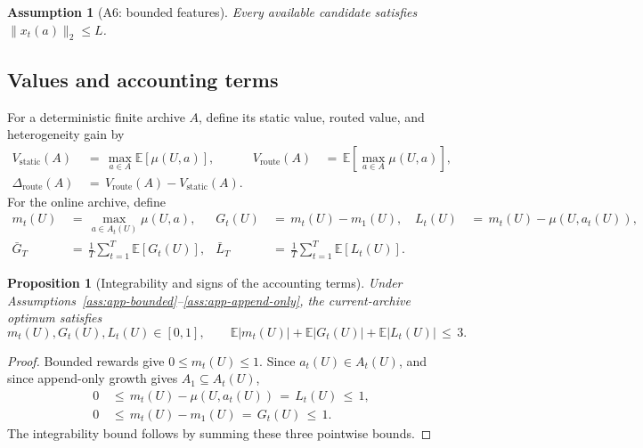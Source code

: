 \documentclass{article} %
\newtheorem{proposition}[theorem]{Proposition}
\newtheorem{assumption}{Assumption}
\begin{document}
\begin{assumption}[A6: bounded features]
\label{ass:app-features}
Every available candidate satisfies \(\|x_t(a)\|_2\leq L\).
\end{assumption}

\subsection{Values and accounting terms}

For a deterministic finite archive \(A\), define its static value, routed
value, and heterogeneity gain by
\begin{equation}
\begin{aligned}
V_{\mathrm{static}}(A)
&\,=\,\max_{a\in A}\mathbb E[\mu(U,a)], &
V_{\mathrm{route}}(A)
&\,=\,\mathbb E\!\left[\max_{a\in A}\mu(U,a)\right], \\
\Delta_{\mathrm{route}}(A)
&\,=\,V_{\mathrm{route}}(A)-V_{\mathrm{static}}(A).
\end{aligned}
\end{equation}
For the online archive, define
\begin{equation}
\begin{aligned}
m_t(U)
&\,=\,\max_{a\in A_t(U)}\mu(U,a), &
G_t(U)
&\,=\,m_t(U)-m_1(U), &
L_t(U)
&\,=\,m_t(U)-\mu(U,a_t(U)), \\
\bar G_T
&\,=\,\frac1T\sum_{t=1}^T\mathbb E[G_t(U)], &
\bar L_T
&\,=\,\frac1T\sum_{t=1}^T\mathbb E[L_t(U)].
\end{aligned}
\end{equation}

\begin{proposition}[Integrability and signs of the accounting terms]
\label{prop:1}
Under Assumptions~\ref{ass:app-bounded}--\ref{ass:app-append-only}, the current-archive optimum satisfies
\begin{equation}
m_t(U),G_t(U),L_t(U)\in[0,1],
\qquad
\mathbb E|m_t(U)|+\mathbb E|G_t(U)|+\mathbb E|L_t(U)|
\,\leq\,3.
\end{equation}
\end{proposition}

\begin{proof}
Bounded rewards give \(0\leq m_t(U)\leq1\).  Since
\(a_t(U)\in A_t(U)\), and since append-only growth gives
\(A_1\subseteq A_t(U)\),
\begin{equation}
\begin{aligned}
0
&\,\leq\,m_t(U)-\mu(U,a_t(U))
      \,=\,L_t(U)\,\leq\,1, \\
0
&\,\leq\,m_t(U)-m_1(U)
      \,=\,G_t(U)\,\leq\,1.
\end{aligned}
\end{equation}
The integrability bound follows by summing these three pointwise bounds.
\end{proof}
\end{document}
